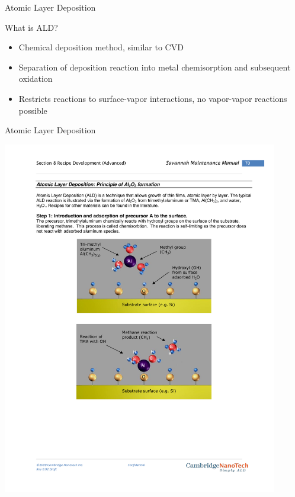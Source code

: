\documentclass[professionalfont]{beamer}
\begin{document}
\begin{frame}{Atomic Layer Deposition}
	\begin{block}{What is ALD?}
		\begin{itemize}
			\item Chemical deposition method, similar to CVD
			\item Separation of deposition reaction into metal chemisorption and subsequent oxidation
			\item Restricts reactions to surface-vapor interactions, no vapor-vapor reactions possible
		\end{itemize}
	\end{block}
\end{frame}

\begin{frame}{Atomic Layer Deposition}
	\begin{overprint}
		\centerline{\includegraphics[width=0.9\textwidth]{./Graphics/Synthesis/TMA1}}

\end{overprint}
\end{frame}
\end{document}

